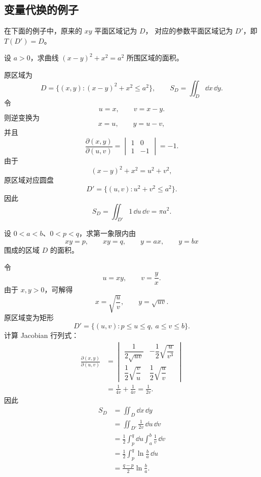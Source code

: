 \subsection*{变量代换的例子}

在下面的例子中，原来的 $xy$ 平面区域记为 $D$，
对应的参数平面区域记为 $D'$，即 $T(D')=D$。

\begin{example}[线性代换计算面积]
设 $a>0$，求曲线 $(x-y)^2+x^2=a^2$ 所围区域的面积。
\end{example}
\begin{solution}
原区域为
\[
D=\{(x,y):(x-y)^2+x^2\le a^2\},
\qquad
S_D=\iint_D\dd x\,\dd y.
\]
令
\[
u=x,\qquad v=x-y.
\]
则逆变换为
\[
x=u,\qquad y=u-v,
\]
并且
\[
\frac{\partial(x,y)}{\partial(u,v)}
=\begin{vmatrix}1&0\\1&-1\end{vmatrix}=-1.
\]
由于
\[
(x-y)^2+x^2=u^2+v^2,
\]
原区域对应圆盘
\[
D'=\{(u,v):u^2+v^2\le a^2\}.
\]
因此
\[
S_D=\iint_{D'}1\,\dd u\,\dd v=\pi a^2.
\]
\end{solution}

\begin{example}[双曲线与射线围成区域的面积]
设 $0<a<b$、$0<p<q$，求第一象限内由
\[
xy=p,\qquad xy=q,\qquad y=ax,\qquad y=bx
\]
围成的区域 $D$ 的面积。
\end{example}
\begin{solution}

\begin{center}

\end{center}

令
\[
u=xy,\qquad v=\frac yx.
\]
由于 $x,y>0$，可解得
\[
x=\sqrt{\frac uv},\qquad y=\sqrt{uv}.
\]
原区域变为矩形
\[
D'=\{(u,v):p\le u\le q,\ a\le v\le b\}.
\]
计算 Jacobian 行列式：
\[
\begin{aligned}
\frac{\partial(x,y)}{\partial(u,v)}
&=\begin{vmatrix}
\dfrac1{2\sqrt{uv}}&-\dfrac12\sqrt{\dfrac u{v^3}}\\[7pt]
\dfrac12\sqrt{\dfrac vu}&\dfrac12\sqrt{\dfrac uv}
\end{vmatrix}\\
&=\frac1{4v}+\frac1{4v}
=\frac1{2v}.
\end{aligned}
\]
因此
\[
\begin{aligned}
S_D
&=\iint_D\dd x\,\dd y\\
&=\iint_{D'}\frac1{2v}\,\dd u\,\dd v\\
&=\frac12\int_p^q\dd u\int_a^b\frac1v\,\dd v\\
&=\frac12\int_p^q\ln\frac ba\,\dd u\\
&=\frac{q-p}{2}\ln\frac ba.
\end{aligned}
\]

\end{solution}

